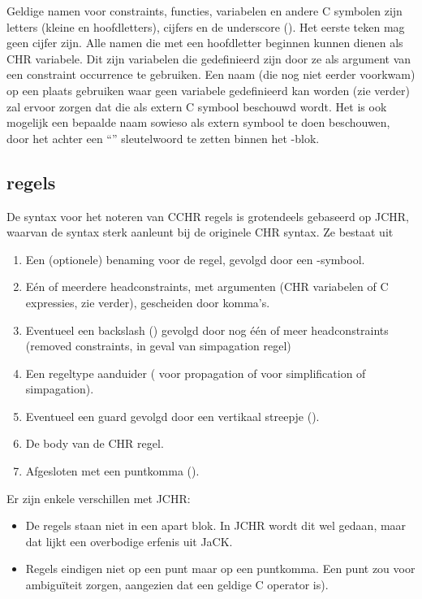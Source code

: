 Geldige namen voor constraints, functies, variabelen en andere C symbolen zijn letters (kleine en hoofdletters), cijfers en de underscore (\code{\_}). Het eerste teken mag geen cijfer zijn. Alle namen die met een hoofdletter beginnen kunnen dienen als CHR variabele. Dit zijn variabelen die gedefinieerd zijn door ze als argument van een constraint occurrence te gebruiken. Een naam (die nog niet eerder voorkwam) op een plaats gebruiken waar geen variabele gedefinieerd kan worden (zie verder) zal ervoor zorgen dat die als extern C symbool beschouwd wordt. Het is ook mogelijk een bepaalde naam sowieso als extern symbool te doen beschouwen, door het achter een ``'' sleutelwoord te zetten binnen het -blok.

\subsection{regels} \label{sec:rules}

De syntax voor het noteren van CCHR regels is grotendeels gebaseerd op JCHR, waarvan de syntax sterk aanleunt bij de
originele CHR syntax. Ze bestaat uit \begin{enumerate}
  \item Een (optionele) benaming voor de regel, gevolgd door een -symbool.
  \item E\'en of meerdere headconstraints, met argumenten (CHR variabelen of C expressies, zie verder), gescheiden door komma's.
  \item Eventueel een backslash (\code{$\backslash$}) gevolgd door nog \'e\'en of meer headconstraints (removed constraints, in geval van simpagation regel)
  \item Een regeltype aanduider (\code{==>} voor propagation of \code{<=>} voor simplification of simpagation).
  \item Eventueel een guard gevolgd door een vertikaal streepje (\code{|}).
  \item De body van de CHR regel.
  \item Afgesloten met een puntkomma (\code{;}).
\end{enumerate}

Er zijn enkele verschillen met JCHR: \begin{itemize}
  \item De regels staan niet in een apart  blok. In JCHR wordt dit wel gedaan, maar dat lijkt een overbodige erfenis uit JaCK.
  \item Regels eindigen niet op een punt maar op een puntkomma. Een punt zou voor ambigu\"iteit zorgen, aangezien dat een geldige C operator is).
\end{itemize}

